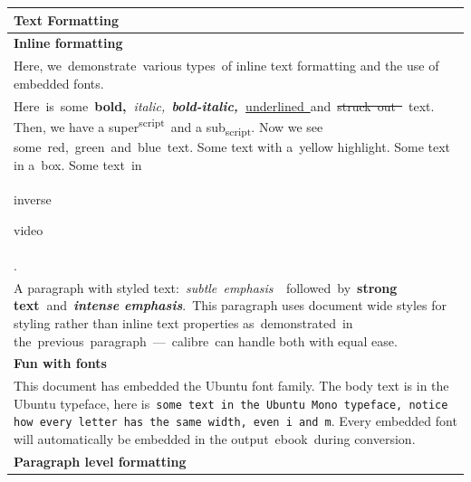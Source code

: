 \documentclass[\officeparserdriver 12pt]{article}
\providecommand{\ophlaaaaaa}[1]{{\setlength{\fboxsep}{1pt}\colorbox{hex000000}{\strut #1}}}
\begin{document}
\begin{longtable}{|*{1}{>{\raggedright\arraybackslash}p{\dimexpr(\linewidth-2\tabcolsep-2\arrayrulewidth)/1\relax}|}}
\hline
\textcolor{hex365F91}{\textbf{{\fontsize{14pt}{16.8pt}\selectfont Text Formatting~}}} \\
\hline
\endhead
\textcolor{hex4F81BD}{\textbf{{\fontsize{13pt}{15.6pt}\selectfont Inline formatting~}}} \\
\hline
Here, we~demonstrate~various types~of inline text formatting and the use of embedded fonts.~ \\
\hline
\textcolor{hex000000}{Here~is~some~}\textcolor{hex000000}{\textbf{bold,~}}\textcolor{hex000000}{\textit{italic,~}}\textcolor{hex000000}{\textit{\textbf{bold-italic,~}}}\textcolor{hex000000}{\uline{underlined~}}\textcolor{hex000000}{and~}\textcolor{hex000000}{\sout{struck~out~}}\textcolor{hex000000}{~text. Then, we have a super}\textcolor{hex000000}{\textsuperscript{{\fontsize{9.5pt}{11.4pt}\selectfont script}}}\textcolor{hex000000}{~and a sub}\textcolor{hex000000}{\textsubscript{{\fontsize{9.5pt}{11.4pt}\selectfont script}}}\textcolor{hex000000}{. Now we see some~}\textcolor{hexFF0000}{red}\textcolor{hex000000}{,~}\textcolor{hex92D050}{green}\textcolor{hex000000}{~and~}\textcolor{hex0070C0}{blue}\textcolor{hex000000}{~text. Some text with a~yellow highlight. Some text in a~box. Some text~in~} \\
\hline
\textcolor{hexFFFFFF}{\ophlaaaaaa{inverse} \ophlaaaaaa{video}} \\
\hline
\textcolor{hex000000}{.} \\
\hline
A paragraph with styled text:~\textcolor{hex808080}{\textit{subtle~emphasis~~}}followed~by~\textbf{strong text~}and~\textcolor{hex4F81BD}{\textit{\textbf{intense emphasis}}}.~This paragraph uses document wide styles for styling rather than inline text properties as~demonstrated~in the~previous~paragraph~—~calibre~can handle both with equal ease.~ \\
\hline
\textcolor{hex4F81BD}{\textbf{{\fontsize{13pt}{15.6pt}\selectfont Fun with fonts~}}} \\
\hline
This document has embedded the Ubuntu font family. The body text is in the Ubuntu typeface, here is~\texttt{some text in the Ubuntu Mono typeface, notice how every letter has the same width, even~i~and m}. Every embedded font will automatically be embedded in the output~ebook~during conversion.~~ \\
\hline
\textcolor{hex4F81BD}{\textbf{{\fontsize{13pt}{15.6pt}\selectfont Paragraph level formatting~}}} \\

\end{longtable}
\end{document}
